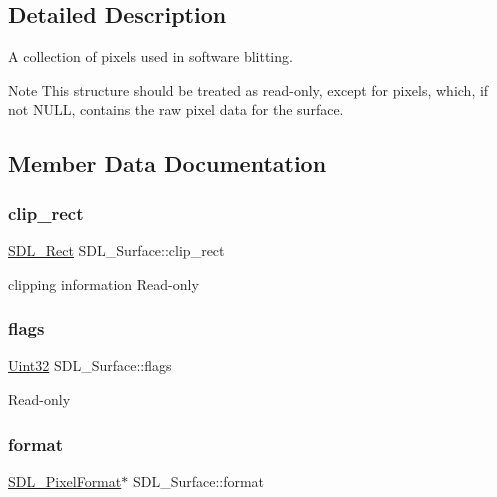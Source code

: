 \subsection{Detailed Description}
A collection of pixels used in software blitting. 

\begin{DoxyNote}{Note}
This structure should be treated as read-\/only, except for {\ttfamily pixels}, which, if not N\+U\+LL, contains the raw pixel data for the surface. 
\end{DoxyNote}


\subsection{Member Data Documentation}
\mbox{\label{struct_s_d_l___surface_aa9a0da3b38261dad6cf0cc4e3bb5b0c3}} 
\subsubsection{\texorpdfstring{clip\+\_\+rect}{clip\_rect}}
{\footnotesize\ttfamily \hyperlink{struct_s_d_l___rect}{S\+D\+L\+\_\+\+Rect} S\+D\+L\+\_\+\+Surface\+::clip\+\_\+rect}

clipping information Read-\/only \mbox{\label{struct_s_d_l___surface_a86d78b665d5dfd7aa1dd9696b067641b}} 
\subsubsection{\texorpdfstring{flags}{flags}}
{\footnotesize\ttfamily \hyperlink{_s_d_l__stdinc_8h_add440eff171ea5f55cb00c4a9ab8672d}{Uint32} S\+D\+L\+\_\+\+Surface\+::flags}

Read-\/only \mbox{\label{struct_s_d_l___surface_a0a90721f947c10c3b79e02ccb419ca62}} 
\subsubsection{\texorpdfstring{format}{format}}
{\footnotesize\ttfamily \hyperlink{struct_s_d_l___pixel_format}{S\+D\+L\+\_\+\+Pixel\+Format}$\ast$ S\+D\+L\+\_\+\+Surface\+::format}

